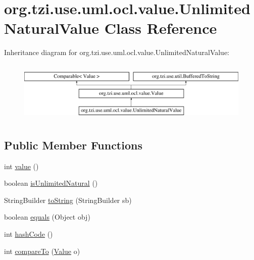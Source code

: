 \hypertarget{classorg_1_1tzi_1_1use_1_1uml_1_1ocl_1_1value_1_1_unlimited_natural_value}{\section{org.\-tzi.\-use.\-uml.\-ocl.\-value.\-Unlimited\-Natural\-Value Class Reference}
\label{classorg_1_1tzi_1_1use_1_1uml_1_1ocl_1_1value_1_1_unlimited_natural_value}
}
Inheritance diagram for org.\-tzi.\-use.\-uml.\-ocl.\-value.\-Unlimited\-Natural\-Value\-:\begin{figure}[H]
\begin{center}
\leavevmode
\includegraphics[height=2.937063cm]{classorg_1_1tzi_1_1use_1_1uml_1_1ocl_1_1value_1_1_unlimited_natural_value}
\end{center}
\end{figure}
\subsection*{Public Member Functions}
\begin{DoxyCompactItemize}
\item 
int \hyperlink{classorg_1_1tzi_1_1use_1_1uml_1_1ocl_1_1value_1_1_unlimited_natural_value_a0ea02dacef78d354578132f08c3eaa20}{value} ()
\item 
boolean \hyperlink{classorg_1_1tzi_1_1use_1_1uml_1_1ocl_1_1value_1_1_unlimited_natural_value_a34bd14bd7fdc9ddd229158a6cd5b73c9}{is\-Unlimited\-Natural} ()
\item 
String\-Builder \hyperlink{classorg_1_1tzi_1_1use_1_1uml_1_1ocl_1_1value_1_1_unlimited_natural_value_ac9892596f65a13a5b1cf1b0798803c13}{to\-String} (String\-Builder sb)
\item 
boolean \hyperlink{classorg_1_1tzi_1_1use_1_1uml_1_1ocl_1_1value_1_1_unlimited_natural_value_ad2cbc627fa51ee2f8b7c18f155d7d214}{equals} (Object obj)
\item 
int \hyperlink{classorg_1_1tzi_1_1use_1_1uml_1_1ocl_1_1value_1_1_unlimited_natural_value_a9d5778c5c50e3902a10ee50eb6330a49}{hash\-Code} ()
\item 
int \hyperlink{classorg_1_1tzi_1_1use_1_1uml_1_1ocl_1_1value_1_1_unlimited_natural_value_a8d7c7a420513d8073f4376b866b27891}{compare\-To} (\hyperlink{classorg_1_1tzi_1_1use_1_1uml_1_1ocl_1_1value_1_1_value}{Value} o)
\end{DoxyCompactItemize}
